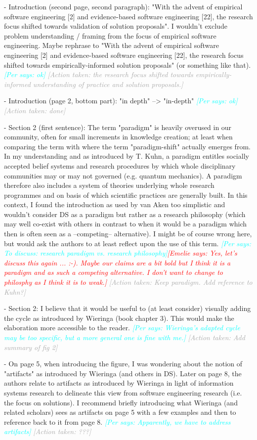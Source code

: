 \documentclass{article}
\newcommand{\emelie}[1]{\textcolor{red}{{\it [Emelie says: #1]}}}
\newcommand{\per}[1]{\textcolor{cyan}{{\it [Per says: #1]}}}
\newcommand{\action}[1]{\textcolor{darkgray}{{\it [Action taken: #1]}}}
\newcommand{\emelie}[1]{}
\newcommand{\per}[1]{}
\newcommand{\action}[1]{}
\begin{document}
- Introduction (second page, second paragraph): "With the advent of empirical software engineering [2] and evidence-based software engineering [22], the research focus shifted towards validation of solution proposals". I wouldn't exclude problem understanding / framing from the focus of empirical software engineering. Maybe rephrase to "With the advent of empirical software engineering [2] and evidence-based software engineering [22], the research focus shifted towards empirically-informed solution proposals" (or something like that). \per{ok} \action{ the research focus shifted towards  empirically-informed understanding of practice and solution proposals.}

- Introduction (page 2, bottom part): "in depth" --> "in-depth"  \per{ok} \action{done}


- Section 2 (first sentence): The term "paradigm" is heavily overused in our community, often for small increments in knowledge creation; at least when comparing the term with  where the term "paradigm-shift" actually emerges from. In my understanding and as introduced by T. Kuhn, a paradigm entitles socially accepted belief systems and research procedures by which whole disciplinary communities may or may not governed (e.g. quantum mechanics). A paradigm therefore also includes a system of theories underlying whole research programmes and on basis of which scientific practices are generally built. In this context, I found the introduction as used by van Aken too simplistic and wouldn't consider DS as a paradigm but rather as a research philosophy (which may well co-exist with others in contrast to when it would be a paradigm which then is often seen as a --competing-- alternative). I might be of course wrong here, but would ask the authors to at least reflect upon the use of this term. \per{To discuss: research paradigm vs. research philosophy}\emelie{Yes, let's discuss this again ... :-). Maybe our claims are a bit bold but I think it is a paradigm and as such a competing alternative. I don't want to change to philosphy as I think it is to weak.} \action{Keep paradigm. Add reference to Kuhn?}

- Section 2: I believe that it would be useful to (at least consider) visually adding the cycle as introduced by Wieringa (book chapter 3). This would make the elaboration more accessible to the reader. \per{Wieringa's adapted cycle may be too specific, but a more general one is fine with me.} \action{Add summary of fig 2}

- On page 5, when introducing the figure, I was wondering about the notion of "artifacts" as introduced by Wieringa (and others in DS). Later on page 8, the authors relate to artifacts as introduced by Wieringa in light of information systems research to delineate this view from software engineering research (i.e. the focus on solutions). I recommend briefly introducing what Wieringa (and related scholars) sees as artifacts on page 5 with a few examples and then to reference back to it from page 8. \per{Apparently, we have to address artifacts} \action{???}
\end{document}
